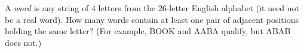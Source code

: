 A \emph{word} is any string of $4$ letters from the $26$-letter English alphabet (it need not be a real word). How many words contain at least one pair of adjacent positions holding the same letter? (For example, BOOK and AABA qualify, but ABAB does not.)
